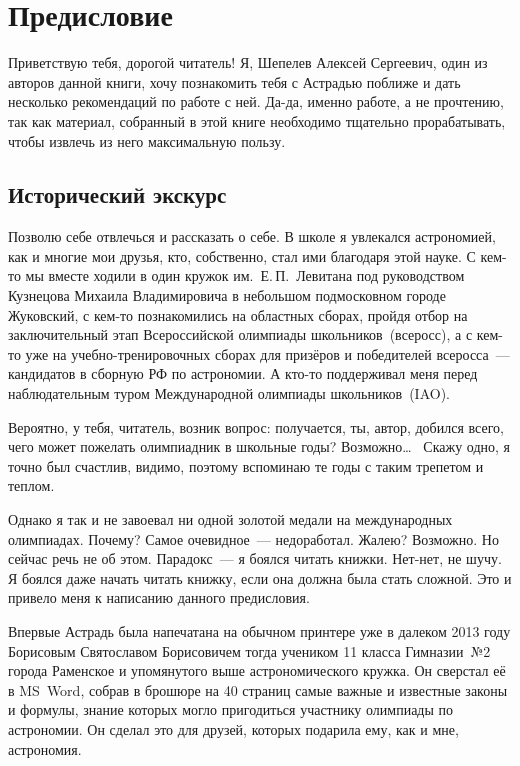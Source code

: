 \section*{Предисловие}

Приветствую тебя, дорогой читатель! Я, Шепелев Алексей Сергеевич, один из авторов данной книги, хочу познакомить тебя с Астрадью поближе и дать несколько рекомендаций по работе с ней. Да-да, именно работе, а не прочтению, так как материал, собранный в этой книге необходимо тщательно прорабатывать, чтобы извлечь из него максимальную пользу.

\subsection*{Исторический экскурс}

Позволю себе отвлечься и рассказать о себе. В школе я увлекался астрономией, как и многие мои друзья, кто, собственно, стал ими благодаря этой науке.  С кем-то мы вместе ходили в один кружок им.~Е.\,П.~Левитана под руководством Кузнецова Михаила Владимировича в небольшом подмосковном городе Жуковский, с кем-то познакомились на областных сборах, пройдя отбор на заключительный этап Всероссийской олимпиады школьников~(всеросс), а с кем-то уже на учебно-трениро\-вочных сборах для призёров и победителей всеросса~--- кандидатов в сборную РФ по астрономии. А кто-то поддерживал меня перед наблюдательным туром Международной олимпиады школьников~(IAO).

Вероятно, у тебя, читатель, возник вопрос: получается, ты, автор, добился всего, чего может пожелать олимпиадник в школьные годы? Возможно\dots~ Скажу одно, я точно был счастлив, видимо, поэтому вспоминаю те годы с таким трепетом и теплом.

Однако я так и не завоевал ни одной золотой медали на международных олимпиадах. Почему? Самое очевидное~--- недоработал. Жалею? Возможно. Но сейчас речь не об этом. Парадокс~--- я боялся читать книжки. Нет-нет, не шучу. Я боялся даже начать читать книжку, если она должна была стать сложной. Это и привело меня к написанию данного предисловия.

Впервые Астрадь была напечатана на обычном принтере уже в далеком 2013 году Борисовым Святославом Борисовичем тогда учеником 11 класса Гимназии~№2 города Раменское и упомянутого выше астрономического кружка. Он сверстал её в MS~Word, собрав в брошюре на 40 страниц самые важные и известные законы и формулы, знание которых могло пригодиться участнику олимпиады по астрономии. Он сделал это для друзей, которых подарила ему, как и мне, астрономия.

